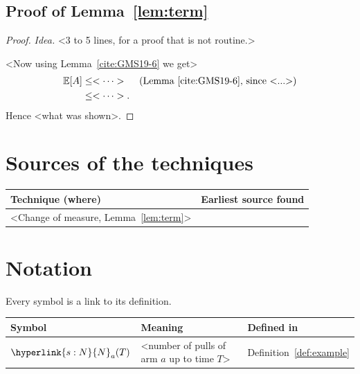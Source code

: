 \documentclass[11pt]{article}
\newcommand{\E}{\mathbb{E}}
\newcommand{\sy}[2]{\hyperlink{#1}{#2}}
\newcommand{\N}{\sy{s:N}{N}}
\begin{document}
\subsection{Proof of Lemma~\ref{lem:term}}\label{sec:proof-term}

\begin{proof}
\emph{Idea.} <3 to 5 lines, for a proof that is not routine.>

<Now using Lemma~\ref{cite:GMS19-6} we get>
\begin{align*}
  \E[A] &\le <\dots> && \text{(Lemma~\ref{cite:GMS19-6}, since <...>)}\\
        &\le <\dots>.
\end{align*}
Hence <what was shown>.
\end{proof}

\section{Sources of the techniques}\label{sec:attribution}

\begin{center}
\begin{tabular}{@{}p{}p{}@{}}
\toprule
Technique (where) & Earliest source found \\
\midrule
<Change of measure, Lemma~\ref{lem:term}> & \citet[inequality~(6)]{GMS19} \\
\bottomrule
\end{tabular}
\end{center}

\section{Notation}\label{sec:notation}

Every symbol is a link to its definition.
\begin{center}
\begin{tabular}{@{}lll@{}}
\toprule
Symbol & Meaning & Defined in \\
\midrule
$\N_a(T)$ & <number of pulls of arm $a$ up to time $T$> & Definition~\ref{def:example} \\
\bottomrule
\end{tabular}
\end{center}



\end{document}
